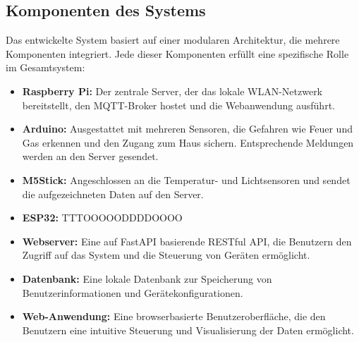 \documentclass[12pt, letterpaper]{article}
\begin{document}
\subsection{Komponenten des Systems}
\par Das entwickelte System basiert auf einer modularen Architektur, die mehrere Komponenten integriert. Jede dieser Komponenten erfüllt eine spezifische Rolle im Gesamtsystem: 
\begin{itemize} 
  \item \textbf{Raspberry Pi:} Der zentrale Server, der das lokale WLAN-Netzwerk bereitstellt, den MQTT-Broker hostet und die Webanwendung ausführt. 
  \item \textbf{Arduino:} Ausgestattet mit mehreren Sensoren, die Gefahren wie Feuer und Gas erkennen und den Zugang zum Haus sichern. Entsprechende Meldungen werden an den Server gesendet.
  \item \textbf{M5Stick:} Angeschlossen an die Temperatur- und Lichtsensoren und sendet die aufgezeichneten Daten auf den Server. 
  \item \textbf{ESP32:} TTTOOOOODDDDOOOO 
  \item \textbf{Webserver:} Eine auf FastAPI basierende RESTful API, die Benutzern den Zugriff auf das System und die Steuerung von Geräten ermöglicht. 
  \item \textbf{Datenbank:} Eine lokale Datenbank zur Speicherung von Benutzerinformationen und Gerätekonfigurationen.
  \item \textbf{Web-Anwendung:} Eine browserbasierte Benutzeroberfläche, die den Benutzern eine intuitive Steuerung und Visualisierung der Daten ermöglicht. 
\end{itemize}
\end{document}

